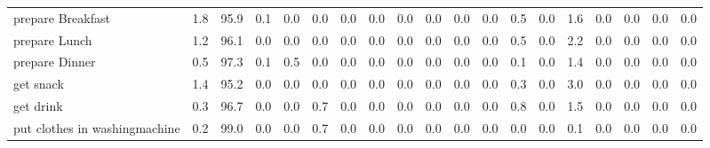 \documentclass{article}
\begin{document}
\begin{sideways}
\begin{tabular}{lrrrrrrrrrrrrrrrrrr}
prepare Breakfast             &         1.8 &               95.9 &           0.1 &                          0.0 &                0.0 &                0.0 &                        0.0 &          0.0 &              0.0 &                0.0 &                    0.0 &                      0.5 &                  0.0 &                   1.6 &              0.0 &              0.0 &                                  0.0 &          0.0 \\
prepare Lunch                 &         1.2 &               96.1 &           0.0 &                          0.0 &                0.0 &                0.0 &                        0.0 &          0.0 &              0.0 &                0.0 &                    0.0 &                      0.5 &                  0.0 &                   2.2 &              0.0 &              0.0 &                                  0.0 &          0.0 \\
prepare Dinner                &         0.5 &               97.3 &           0.1 &                          0.5 &                0.0 &                0.0 &                        0.0 &          0.0 &              0.0 &                0.0 &                    0.0 &                      0.1 &                  0.0 &                   1.4 &              0.0 &              0.0 &                                  0.0 &          0.0 \\
get snack                     &         1.4 &               95.2 &           0.0 &                          0.0 &                0.0 &                0.0 &                        0.0 &          0.0 &              0.0 &                0.0 &                    0.0 &                      0.3 &                  0.0 &                   3.0 &              0.0 &              0.0 &                                  0.0 &          0.0 \\
get drink                     &         0.3 &               96.7 &           0.0 &                          0.0 &                0.7 &                0.0 &                        0.0 &          0.0 &              0.0 &                0.0 &                    0.0 &                      0.8 &                  0.0 &                   1.5 &              0.0 &              0.0 &                                  0.0 &          0.0 \\
put clothes in washingmachine &         0.2 &               99.0 &           0.0 &                          0.0 &                0.7 &                0.0 &                        0.0 &          0.0 &              0.0 &                0.0 &                    0.0 &                      0.0 &                  0.0 &                   0.1 &              0.0 &              0.0 &                                  0.0 &          0.0 \\

\end{tabular}
\end{sideways}
\end{document}

